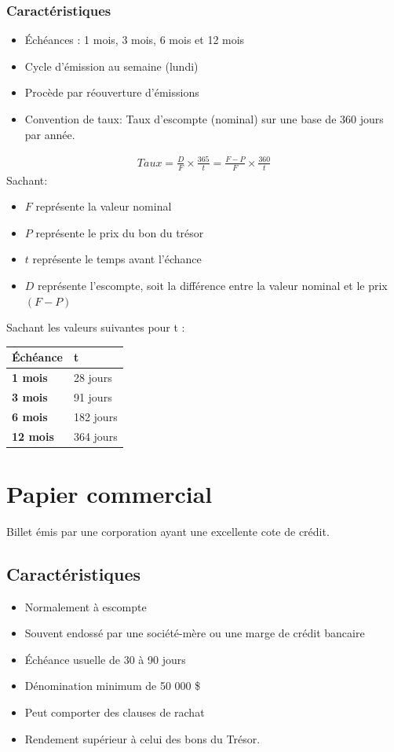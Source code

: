 \documentclass[letterpaper, 12pt]{article}
\newcommand{\1}{\mathds{1}}	%
\theoremstyle{definition}
\begin{document}
\subsubsection{Caractéristiques}
\begin{itemize}
\item  Échéances : 1 mois, 3 mois,  6 mois et 12 mois
\item Cycle d’émission au semaine (lundi)
\item Procède par réouverture d’émissions
\item Convention de taux: Taux d’escompte (nominal) sur une base de 360 jours par année.
\end{itemize}
\begin{align*}
Taux = \frac{D}{F} \times \frac{365}{t}=\frac{F-P}{F} \times \frac{360}{t}
\end{align*}
Sachant:
\begin{itemize}
\item $F$ représente la valeur nominal 
\item $P$ représente le prix du bon du trésor 
\item $t$ représente le temps avant l'échance 
\item $D$ représente l'escompte, soit la différence entre la valeur nominal et le prix $(F-P)$
\end{itemize}


Sachant les valeurs suivantes pour t :
\begin{table}[H]
\centering
\begin{tabular}{@{}ll@{}}
\toprule
\textbf{Échéance} & \textbf{t} \\ \midrule
\textbf{1 mois}   & 28 jours   \\
\textbf{3 mois}   & 91 jours   \\
\textbf{6 mois}   & 182 jours  \\
\textbf{12 mois}  & 364 jours  \\ \bottomrule
\end{tabular}
\end{table}
\newpage
\section{Papier commercial}
Billet émis par une corporation ayant une excellente cote de crédit.
\subsection{Caractéristiques}
\begin{itemize}
\item Normalement à escompte
\item Souvent endossé par une société-mère ou une marge de crédit bancaire
\item Échéance usuelle de 30 à 90 jours
\item Dénomination minimum de 50 000 \$
\item Peut comporter des clauses de rachat
\item Rendement supérieur à celui des bons du Trésor.
\end{itemize}
\end{document}
